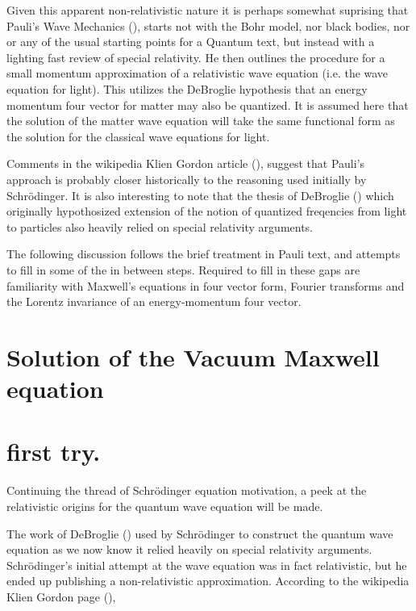\documentclass[]{eliblog}
\begin{document}
Given this apparent non-relativistic nature it is perhaps somewhat suprising that Pauli's Wave Mechanics (\cite{pauli2000wm}),
starts not with the Bohr model, nor black bodies, nor or any of the usual starting points for a Quantum text,
but instead with a lighting fast review of special relativity.
He then outlines the procedure for a small momentum approximation of a relativistic wave equation (i.e. the wave equation for light).
This utilizes the DeBroglie hypothesis that an energy momentum four vector for matter may also be quantized.  
It is assumed here that
the solution of the matter wave equation will take the same functional form as the solution for the classical wave equations
for light.

Comments in
the wikipedia Klien Gordon article (\cite{wikiKG}), suggest that Pauli's approach is probably closer historically to
the reasoning used initially
by Schr\"{o}dinger.  It is also interesting to note that the thesis of DeBroglie (\cite{AFkracklauerDeBroglie}) which
originally hypothosized extension of the notion of quantized freqencies from light to particles 
also heavily relied on special relativity arguments.

The following discussion follows the brief treatment in Pauli text, and attempts to fill in some of the in between steps.
Required to fill in these gaps are familiarity with Maxwell's equations in four vector form,
Fourier transforms and the Lorentz invariance of an energy-momentum four vector.

\section{Solution of the Vacuum Maxwell equation}
%
%

\section{first try.}
Continuing the thread of Schr\"{o}dinger equation motivation, a peek at the relativistic origins for the quantum wave equation will be made.

The work of DeBroglie (\cite{AFkracklauerDeBroglie}) used by Schr\"{o}dinger to construct the quantum wave equation as we now know it relied heavily on special relativity arguments.  
Schr\"{o}dinger's initial attempt at the wave equation was in fact relativistic, but he ended up publishing a non-relativistic 
approximation.
According to the wikipedia Klien Gordon page (\cite{wikiKG}), 
\end{document}
